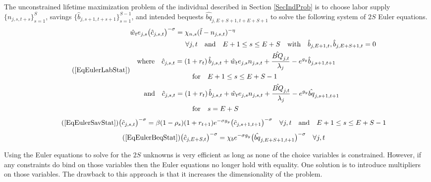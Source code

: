 \documentclass[letterpaper,12pt]{article}
\theoremstyle{definition}
\begin{document}
  The unconstrained lifetime maximization problem of the individual described in Section \ref{SecIndProb} is to choose labor supply $\{n_{j,s,t+s}\}_{s=1}^S$, savings $\{\hat{b}_{j,s+1,t+s+1}\}_{s=1}^{S-1}$, and intended bequests $\hat{bq}_{j,E+S+1,t+E+S+1}$ to solve the following system of $2S$ Euler equations.
  \begin{equation}\tag{\ref{EqEulerLabStat}}
    \begin{split}
      &\hat{w}_t e_{j,s}\bigl(\hat{c}_{j,s,t}\bigr)^{-\sigma} = \chi_{n,s}(\tilde{l} - n_{j,s,t})^{-\eta} \\
      &\quad\quad\quad\quad\quad\quad\quad\quad\forall j,t \quad\text{and}\quad E+1\leq s\leq E+S \quad\text{with}\quad \hat{b}_{j,E+1,t},\hat{b}_{j,E+S+1,t}=0 \\
      &\quad\text{where}\quad \hat{c}_{j,s,t} = \left(1+r_t\right)\hat{b}_{j,s,t} + \hat{w}_t e_{j,s}n_{j,s,t} + \frac{\hat{BQ}_{j,t}}{\lambda_j} - e^{g_y}\hat{b}_{j,s+1,t+1} \\
      &\quad\quad\quad\quad\quad\quad\quad\quad\quad\text{for}\quad E+1\leq s\leq E+S-1 \\
      &\quad\quad\text{and}\quad \hat{c}_{j,s,t} = \left(1+r_t\right)\hat{b}_{j,s,t} + \hat{w}_t e_{j,s}n_{j,s,t} + \frac{\hat{BQ}_{j,t}}{\lambda_j} - e^{g_y}\hat{bq}_{j,s+1,t+1} \\
      &\quad\quad\quad\quad\quad\quad\quad\quad\quad\text{for}\quad s=E+S
    \end{split}
  \end{equation}
  \begin{equation}\tag{\ref{EqEulerSavStat}}
    \bigl(\hat{c}_{j,s,t}\bigr)^{-\sigma} = \beta(1-\rho_s)(1+r_{t+1})e^{-\sigma g_y}\bigl(\hat{c}_{j,s+1,t+1}\bigr)^{-\sigma}\quad\forall j,t \quad\text{and}\quad E+1\leq s\leq E+S-1
  \end{equation}
  \begin{equation}\tag{\ref{EqEulerBeqStat}}
    \bigl(\hat{c}_{j,E+S,t}\bigr)^{-\sigma} = \chi_b e^{-\sigma g_y}\bigl(\hat{bq}_{j,E+S+1,t+1}\bigr)^{-\sigma} \quad\forall j,t
  \end{equation}

  Using the Euler equations to solve for the $2S$ unknowns is very efficient as long as none of the choice variables is constrained. However, if any constraints do bind on those variables then the Euler equations no longer hold with equality. One solution is to introduce multipliers on those variables. The drawback to this approach is that it increases the dimensionality of the problem.
\end{document}
